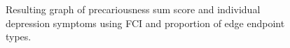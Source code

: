 \documentclass[
]{article}
\begin{document}
\begin{figure}

\begin{minipage}{\linewidth}



\end{minipage}%
\newline
\begin{minipage}{\linewidth}



\end{minipage}%

\caption{\label{fig-presum}Resulting graph of precariousness sum score
and individual depression symptoms using FCI and proportion of edge
endpoint types.}

\end{figure}%
\end{document}
